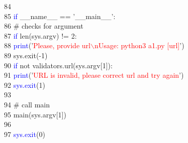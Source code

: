 84	 \hspace*{5mm}\\
85	 \hspace*{5mm}\textcolor{blue}{if} \_\_name\_\_ == '\_\_main\_\_':\\
86	 \hspace*{5mm}    \hspace*{5mm}\# checks for argument\\
87	 \hspace*{5mm}    \hspace*{5mm}\textcolor{blue}{if} len(sys.argv) $!$= 2:\\
88	 \hspace*{5mm}        \hspace*{10mm}\textcolor{blue}{print}('\textcolor{red}{Please, provide url$\backslash$nUsage: python3 a1.py [url]}')\\
89	 \hspace*{5mm}        \hspace*{10mm}sys.exit(-1)\\
90	 \hspace*{5mm}    \hspace*{5mm}\textcolor{blue}{if} not validators.url(sys.argv[1]):\\
91	 \hspace*{5mm}        \hspace*{10mm}\textcolor{blue}{print}('\textcolor{red}{URL is invalid, please correct url and try again}')\\
92	 \hspace*{5mm}        \hspace*{10mm}\textcolor{blue}{sys.exit}(1)\\
93	 \hspace*{5mm}\\
94	 \hspace*{5mm}    \hspace*{5mm}\# call main\\
95	 \hspace*{5mm}    \hspace*{5mm}main(sys.argv[1])\\
96	 \hspace*{5mm}\\
97	 \hspace*{5mm}    \hspace*{5mm}\textcolor{blue}{sys.exit}(0)\\